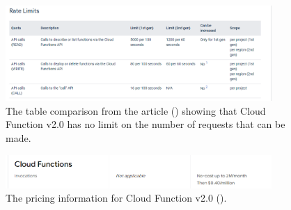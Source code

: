 \begin{figure}[htbp]
  \centering
  \includegraphics[width=0.9\textwidth]{Figures/Cloud Function no limit.png}
  \caption{The table comparison from the article (\textit{\cite{firebaseCloudFunctionLimit}}) showing that Cloud Function v2.0 has no
    limit on the number of requests that can be made.}
\end{figure}

\begin{figure}[htbp]
  \centering
  \includegraphics[width=0.9\textwidth]{Figures/Pricing.png}
  \caption{The pricing information for Cloud Function v2.0 (\textit{\cite{pricing}}).}
\end{figure}






